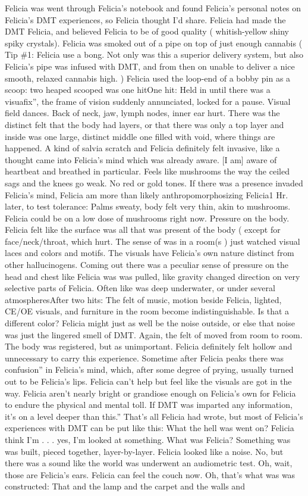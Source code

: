 \documentclass[12pt]{book}
\begin{document}
Felicia was went through Felicia's notebook and found Felicia's personal notes on Felicia's DMT experiences, so Felicia thought I'd share. Felicia had made the DMT Felicia, and believed Felicia to be of good quality ( whitish-yellow shiny spiky crystals). Felicia was smoked out of a pipe on top of just enough cannabis ( Tip \#1: Felicia use a bong. Not only was this a superior delivery system, but also Felicia's pipe was infused with DMT, and from then on unable to deliver a nice smooth, relaxed cannabis high. ) Felicia used the loop-end of a bobby pin as a scoop: two heaped scooped was one hitOne hit: Held in until there was a visuafix'', the frame of vision suddenly annunciated, locked for a pause. Visual field dances. Back of neck, jaw, lymph nodes, inner ear hurt. There was the distinct felt that the body had layers, or that there was only a top layer and inside was one large, distinct middle one filled with void, where things are happened. A kind of salvia scratch and Felicia definitely felt invasive, like a thought came into Felicia's mind which was already aware. [I am] aware of heartbeat and breathed in particular. Feels like mushrooms the way the ceiled sags and the knees go weak. No red or gold tones. If there was a presence invaded Felicia's mind, Felicia am more than likely anthropomorphosizing Felicia1 Hr. later, to test tolerance: Palms sweaty, body felt very thin, akin to mushrooms. Felicia could be on a low dose of mushrooms right now. Pressure on the body. Felicia felt like the surface was all that was present of the body ( except for face/neck/throat, which hurt. The sense of was in a room(s ) just watched visual laces and colors and motifs. The visuals have Felicia's own nature distinct from other hallucinogens. Coming out there was a peculiar sense of pressure on the head and chest like Felicia was was pulled, like gravity changed direction on very selective parts of Felicia. Often like was deep underwater, or under several atmospheresAfter two hits: The felt of music, motion beside Felicia, lighted, CE/OE visuals, and furniture in the room become indistinguishable. Is that a different color? Felicia might just as well be the noise outside, or else that noise was just the lingered smell of DMT. Again, the felt of moved from room to room. The body was registered, but as unimportant. Felicia definitely felt hollow and unnecessary to carry this experience. Sometime after Felicia peaks there was confusion'' in Felicia's mind, which, after some degree of prying, usually turned out to be Felicia's lips. Felicia can't help but feel like the visuals are got in the way. Felicia aren't nearly bright or grandiose enough on Felicia's own for Felicia to endure the physical and mental toll. If DMT was imparted any information, it's on a level deeper than this.'' That's all Felicia had wrote, but most of Felicia's experiences with DMT can be put like this: What the hell was went on? Felicia think I'm . . . yes, I'm looked at something. What was Felicia? Something was was built, pieced together, layer-by-layer. Felicia looked like a noise. No, but there was a sound like the world was underwent an audiometric test. Oh, wait, those are Felicia's ears. Felicia can feel the couch now. Oh, that's what was was constructed: That and the lamp and the carpet and the walls and 
\end{document}
